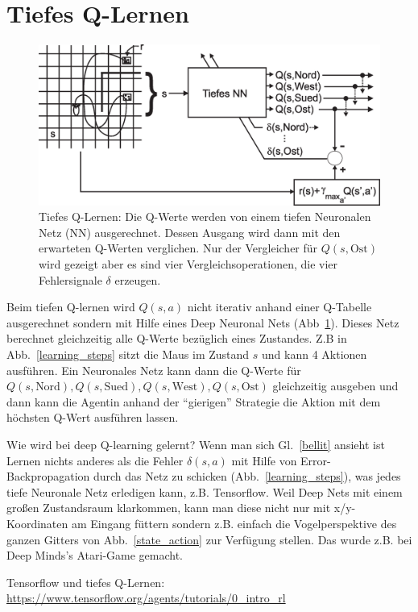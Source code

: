 \documentclass[12pt]{article}
\begin{document}
\section{Tiefes Q-Lernen}
\begin{figure}[!hbt]
\begin{center}
\mbox{\includegraphics[width=\textwidth]{dqn}}
\end{center}
\caption{Tiefes Q-Lernen: Die Q-Werte werden von einem tiefen
  Neuronalen Netz (NN) ausgerechnet. Dessen Ausgang wird dann mit den
  erwarteten Q-Werten verglichen. Nur der Vergleicher für $Q(s,\textrm{Ost})$
  wird gezeigt aber es sind vier Vergleichsoperationen, die vier
  Fehlersignale $\delta$ erzeugen.
\label{dqn}}
\end{figure}
Beim tiefen Q-lernen wird $Q(s,a)$ nicht iterativ anhand einer
Q-Tabelle ausgerechnet sondern mit Hilfe eines Deep Neuronal Nets
(Abb~\ref{dqn}). Dieses Netz berechnet gleichzeitig alle Q-Werte
bezüglich eines Zustandes. Z.B in Abb.~\ref{learning_steps} sitzt die
Maus im Zustand $s$ und kann 4 Aktionen ausführen. Ein Neuronales Netz
kann dann die Q-Werte für $Q(s,\textrm{Nord}), Q(s,\textrm{Sued}),
Q(s,\textrm{West}), Q(s,\textrm{Ost})$ gleichzeitig ausgeben und dann
kann die Agentin anhand der ``gierigen'' Strategie die Aktion mit dem
höchsten Q-Wert ausführen lassen.

Wie wird bei deep Q-learning gelernt? Wenn man sich Gl.~\ref{bellit}
ansieht ist Lernen nichts anderes als die Fehler $\delta(s,a)$ mit
Hilfe von Error-Backpropagation durch das Netz zu schicken
(Abb.~\ref{learning_steps}), was jedes tiefe Neuronale Netz erledigen kann,
z.B. Tensorflow. Weil Deep Nets mit einem großen Zustandsraum
klarkommen, kann man diese nicht nur mit x/y-Koordinaten am Eingang
füttern sondern z.B. einfach die Vogelperspektive des ganzen Gitters
von Abb.~\ref{state_action} zur Verfügung stellen. Das wurde z.B. bei
Deep Minds's Atari-Game gemacht.

Tensorflow und tiefes Q-Lernen:
\url{https://www.tensorflow.org/agents/tutorials/0_intro_rl}
\end{document}
